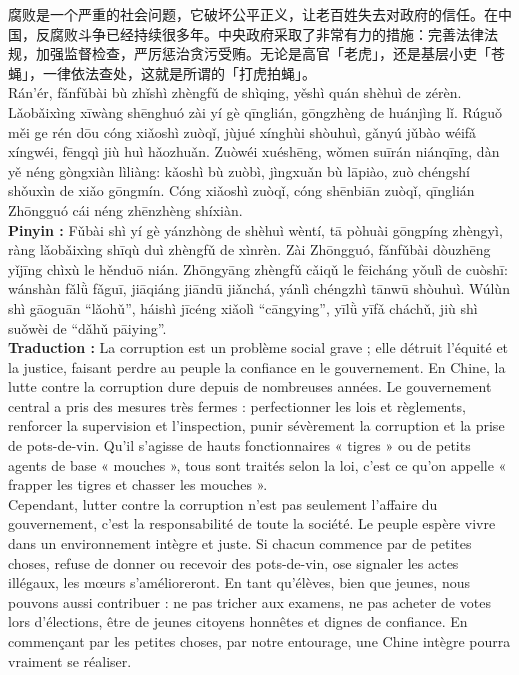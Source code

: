 \documentclass[11pt]{article}
\begin{document}
\begin{textebox}
腐败是一个严重的社会问题，它破坏公平正义，让老百姓失去对政府的信任。在中国，反腐败斗争已经持续很多年。中央政府采取了非常有力的措施：完善法律法规，加强监督检查，严厉惩治贪污受贿。无论是高官「老虎」，还是基层小吏「苍蝇」，一律依法查处，这就是所谓的「打虎拍蝇」。\\
Rán'ér, fǎnfǔbài bù zhǐshì zhèngfǔ de shìqing, yěshì quán shèhuì de zérèn. Lǎobǎixìng xīwàng shēnghuó zài yí gè qīnglián, gōngzhèng de huánjìng lǐ. Rúguǒ měi ge rén dōu cóng xiǎoshì zuòqǐ, jùjué xínghùi shòuhuì, gǎnyú jǔbào wéifǎ xíngwéi, fēngqì jiù huì hǎozhuǎn. Zuòwéi xuéshēng, wǒmen suīrán niánqīng, dàn yě néng gòngxiàn lìliàng: kǎoshì bù zuòbì, jìngxuǎn bù lāpiào, zuò chéngshí shǒuxìn de xiǎo gōngmín. Cóng xiǎoshì zuòqǐ, cóng shēnbiān zuòqǐ, qīnglián Zhōngguó cái néng zhēnzhèng shíxiàn.\\
\textbf{Pinyin :} Fǔbài shì yí gè yánzhòng de shèhuì wèntí, tā pòhuài gōngpíng zhèngyì, ràng lǎobǎixìng shīqù duì zhèngfǔ de xìnrèn. Zài Zhōngguó, fǎnfǔbài dòuzhēng yǐjīng chìxù le hěnduō nián. Zhōngyāng zhèngfǔ cǎiqǔ le fēicháng yǒulì de cuòshī: wánshàn fǎlǜ fǎguī, jiāqiáng jiāndū jiǎnchá, yánlì chéngzhì tānwū shòuhuì. Wúlùn shì gāoguān ``lǎohǔ'', háishì jīcéng xiǎolì ``cāngying'', yīlǜ yīfǎ cháchǔ, jiù shì suǒwèi de ``dǎhǔ pāiying''.\\
\textbf{Traduction :} La corruption est un problème social grave ; elle détruit l'équité et la justice, faisant perdre au peuple la confiance en le gouvernement. En Chine, la lutte contre la corruption dure depuis de nombreuses années. Le gouvernement central a pris des mesures très fermes : perfectionner les lois et règlements, renforcer la supervision et l'inspection, punir sévèrement la corruption et la prise de pots-de-vin. Qu'il s'agisse de hauts fonctionnaires « tigres » ou de petits agents de base « mouches », tous sont traités selon la loi, c'est ce qu'on appelle « frapper les tigres et chasser les mouches ».\\
Cependant, lutter contre la corruption n'est pas seulement l'affaire du gouvernement, c'est la responsabilité de toute la société. Le peuple espère vivre dans un environnement intègre et juste. Si chacun commence par de petites choses, refuse de donner ou recevoir des pots-de-vin, ose signaler les actes illégaux, les mœurs s'amélioreront. En tant qu'élèves, bien que jeunes, nous pouvons aussi contribuer : ne pas tricher aux examens, ne pas acheter de votes lors d'élections, être de jeunes citoyens honnêtes et dignes de confiance. En commençant par les petites choses, par notre entourage, une Chine intègre pourra vraiment se réaliser.
\end{textebox}
\end{document}
